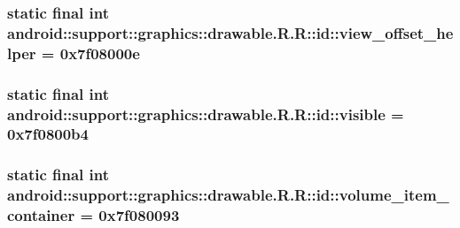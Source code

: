 \hypertarget{classandroid_1_1support_1_1graphics_1_1drawable_1_1_r_1_1id_55770028aeb40eec7d289268078797ca}{
\subsubsection[{view\_\-offset\_\-helper}]{\setlength{\rightskip}{0pt plus 5cm}static final int android::support::graphics::drawable.R.R::id::view\_\-offset\_\-helper = 0x7f08000e}}
\label{classandroid_1_1support_1_1graphics_1_1drawable_1_1_r_1_1id_55770028aeb40eec7d289268078797ca}


\hypertarget{classandroid_1_1support_1_1graphics_1_1drawable_1_1_r_1_1id_652aa11057ce4dd69972cd092657eb1a}{
\subsubsection[{visible}]{\setlength{\rightskip}{0pt plus 5cm}static final int android::support::graphics::drawable.R.R::id::visible = 0x7f0800b4}}
\label{classandroid_1_1support_1_1graphics_1_1drawable_1_1_r_1_1id_652aa11057ce4dd69972cd092657eb1a}


\hypertarget{classandroid_1_1support_1_1graphics_1_1drawable_1_1_r_1_1id_e56c2981b490374a6cebb0ff06ca8ceb}{
\subsubsection[{volume\_\-item\_\-container}]{\setlength{\rightskip}{0pt plus 5cm}static final int android::support::graphics::drawable.R.R::id::volume\_\-item\_\-container = 0x7f080093}}
\label{classandroid_1_1support_1_1graphics_1_1drawable_1_1_r_1_1id_e56c2981b490374a6cebb0ff06ca8ceb}


